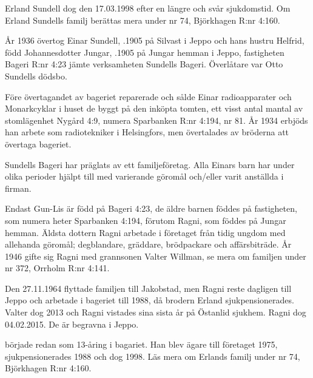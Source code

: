 Erland Sundell dog den 17.03.1998 efter en längre och svår sjukdomstid. Om Erland Sundells familj berättas mera under nr 74, Björkhagen R:nr 4:160.


År 1936 övertog Einar Sundell, .1905 på Silvast i Jeppo och hans hustru Helfrid, född Johannesdotter Jungar, .1905 på Jungar hemman i Jeppo, fastigheten Bageri R:nr 4:23 jämte verksamheten Sundells Bageri. Överlåtare var Otto Sundells dödsbo.

Före övertagandet av bageriet reparerade och sålde Einar radioapparater och Monarkcyklar i huset de byggt på den inköpta tomten, ett visst antal mantal av stomlägenhet Nygård 4:9, numera Sparbanken R:nr 4:194, nr 81. År 1934 erbjöds han arbete som radiotekniker i Helsingfors, men övertalades av bröderna att övertaga bageriet.

Sundells Bageri har präglats av ett familjeföretag. Alla Einars barn har under olika perioder hjälpt till med varierande göromål och/eller varit anställda i firman.
\begin{jhchildren}
  \item {}
  \item {}
  \item {}
  \item {}
  \item {}
\end{jhchildren}
Endast Gun-Lis är född på Bageri 4:23, de äldre barnen föddes på fastigheten, som numera heter Sparbanken 4:194, förutom Ragni, som föddes på Jungar hemman. Äldsta dottern Ragni arbetade i företaget från tidig ungdom med allehanda göromål; degblandare, gräddare, brödpackare och affärsbiträde.  År 1946 gifte sig Ragni med grannsonen Valter Willman, se mera om familjen under nr 372, Orrholm R:nr 4:141.

Den 27.11.1964 flyttade familjen till Jakobstad, men Ragni reste dagligen till Jeppo och arbetade i bageriet till 1988, då brodern Erland sjukpensionerades. Valter dog 2013 och Ragni vistades sina sista år på Östanlid sjukhem. Ragni dog 04.02.2015. De är begravna i Jeppo.

 började redan som 13-åring i bagariet. Han blev ägare till företaget 1975, sjukpensionerades 1988 och dog 1998. Läs mera om Erlands familj under nr 74, Björkhagen R:nr 4:160.

